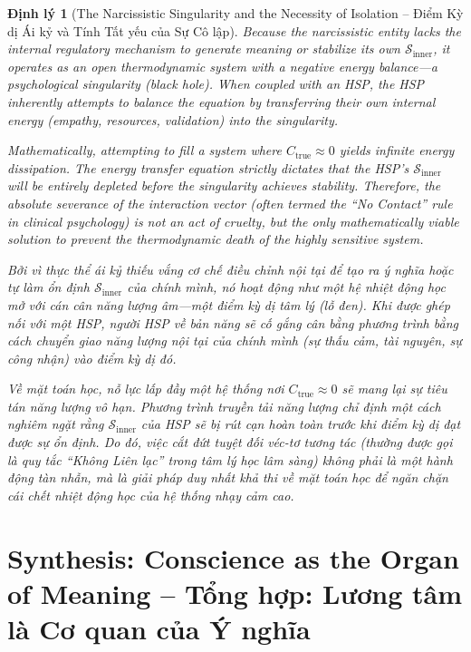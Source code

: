 \documentclass{report}
\newtheorem{dinhly}{Định lý}
\begin{document}
\begin{dinhly}[The Narcissistic Singularity and the Necessity of Isolation -- Điểm Kỳ dị Ái kỷ và Tính Tất yếu của Sự Cô lập]
	Because the narcissistic entity lacks the internal regulatory mechanism to generate meaning or stabilize its own $\mathcal{S}_{\text{inner}}$, it operates as an open thermodynamic system with a negative energy balance—a psychological singularity (black hole). When coupled with an HSP, the HSP inherently attempts to balance the equation by transferring their own internal energy (empathy, resources, validation) into the singularity.
	
	Mathematically, attempting to fill a system where $C_{\text{true}} \approx 0$ yields infinite energy dissipation. The energy transfer equation strictly dictates that the HSP's $\mathcal{S}_{\text{inner}}$ will be entirely depleted before the singularity achieves stability. Therefore, the absolute severance of the interaction vector (often termed the ``No Contact'' rule in clinical psychology) is not an act of cruelty, but the only mathematically viable solution to prevent the thermodynamic death of the highly sensitive system.
	
	Bởi vì thực thể ái kỷ thiếu vắng cơ chế điều chỉnh nội tại để tạo ra ý nghĩa hoặc tự làm ổn định $\mathcal{S}_{\text{inner}}$ của chính mình, nó hoạt động như một hệ nhiệt động học mở với cán cân năng lượng âm—một điểm kỳ dị tâm lý (lỗ đen). Khi được ghép nối với một HSP, người HSP về bản năng sẽ cố gắng cân bằng phương trình bằng cách chuyển giao năng lượng nội tại của chính mình (sự thấu cảm, tài nguyên, sự công nhận) vào điểm kỳ dị đó.
	
	Về mặt toán học, nỗ lực lấp đầy một hệ thống nơi $C_{\text{true}} \approx 0$ sẽ mang lại sự tiêu tán năng lượng vô hạn. Phương trình truyền tải năng lượng chỉ định một cách nghiêm ngặt rằng $\mathcal{S}_{\text{inner}}$ của HSP sẽ bị rút cạn hoàn toàn trước khi điểm kỳ dị đạt được sự ổn định. Do đó, việc cắt đứt tuyệt đối véc-tơ tương tác (thường được gọi là quy tắc ``Không Liên lạc'' trong tâm lý học lâm sàng) không phải là một hành động tàn nhẫn, mà là giải pháp duy nhất khả thi về mặt toán học để ngăn chặn cái chết nhiệt động học của hệ thống nhạy cảm cao.
\end{dinhly}

\section{Synthesis: Conscience as the Organ of Meaning -- Tổng hợp: Lương tâm là Cơ quan của Ý nghĩa}
\end{document}
